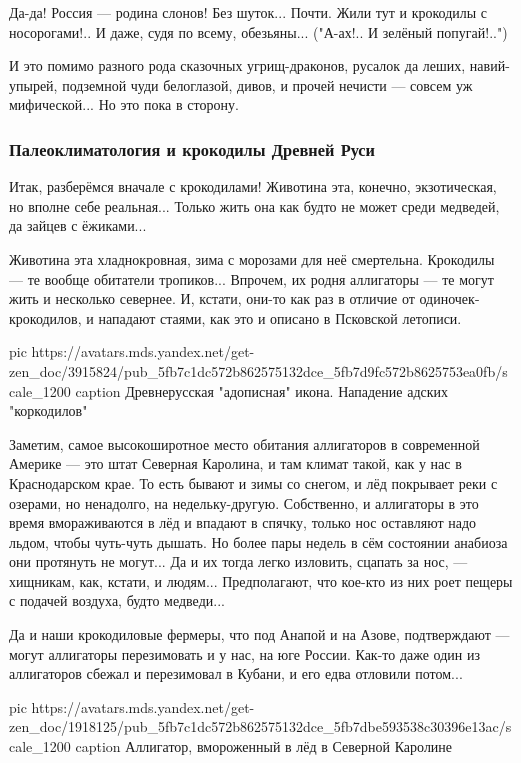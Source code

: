 Да-да! Россия — родина слонов! Без шуток... Почти. Жили тут и крокодилы с
носорогами!.. И даже, судя по всему, обезьяны... ("А-ах!.. И зелёный
попугай!..")

И это помимо разного рода сказочных угрищ-драконов, русалок да леших,
навий-упырей, подземной чуди белоглазой, дивов, и прочей нечисти — совсем уж
мифической... Но это пока в сторону.

\subsubsection{Палеоклиматология и крокодилы Древней Руси}

Итак, разберёмся вначале с крокодилами! Животина эта, конечно, экзотическая, но
вполне себе реальная... Только жить она как будто не может среди медведей, да
зайцев с ёжиками...

Животина эта хладнокровная, зима с морозами для неё смертельна. Крокодилы — те
вообще обитатели тропиков... Впрочем, их родня аллигаторы — те могут жить и
несколько севернее. И, кстати, они-то как раз в отличие от одиночек-крокодилов,
и нападают стаями, как это и описано в Псковской летописи.

\ifcmt
  pic https://avatars.mds.yandex.net/get-zen_doc/3915824/pub_5fb7c1dc572b862575132dce_5fb7d9fc572b8625753ea0fb/scale_1200
	caption Древнерусская "адописная" икона. Нападение адских "коркодилов"
\fi

Заметим, самое высокоширотное место обитания аллигаторов в современной Америке
— это штат Северная Каролина, и там климат такой, как у нас в Краснодарском
крае. То есть бывают и зимы со снегом, и лёд покрывает реки с озерами, но
ненадолго, на недельку-другую. Собственно, и аллигаторы в это время
вмораживаются в лёд и впадают в спячку, только нос оставляют надо льдом, чтобы
чуть-чуть дышать. Но более пары недель в сём состоянии анабиоза они протянуть
не могут... Да и их тогда легко изловить, сцапать за нос, — хищникам, как,
кстати, и людям... Предполагают, что кое-кто из них роет пещеры с подачей
воздуха, будто медведи...

Да и наши крокодиловые фермеры, что под Анапой и на Азове, подтверждают — могут
аллигаторы перезимовать и у нас, на юге России. Как-то даже один из аллигаторов
сбежал и перезимовал в Кубани, и его едва отловили потом... 


\ifcmt
  pic https://avatars.mds.yandex.net/get-zen_doc/1918125/pub_5fb7c1dc572b862575132dce_5fb7dbe593538c30396e13ac/scale_1200
	caption Аллигатор, вмороженный в лёд в Северной Каролине
\fi

